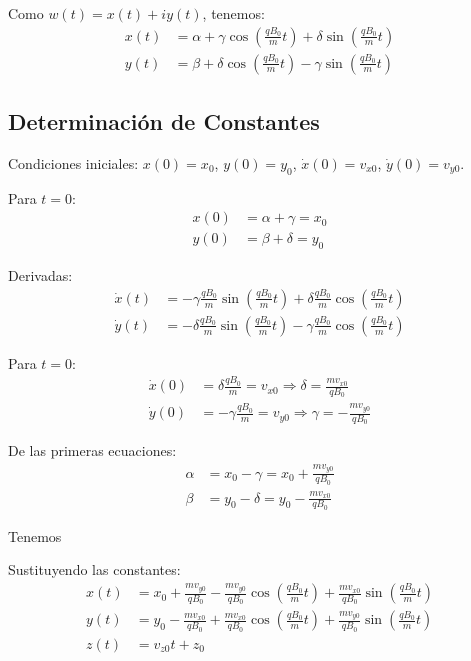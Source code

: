 \documentclass{article}
\begin{document}
Como $w(t) = x(t) + iy(t)$, tenemos:
\begin{align}
x(t) &= \alpha + \gamma\cos\left(\frac{qB_0}{m}t\right) + \delta\sin\left(\frac{qB_0}{m}t\right) \\
y(t) &= \beta + \delta\cos\left(\frac{qB_0}{m}t\right) - \gamma\sin\left(\frac{qB_0}{m}t\right)
\end{align}

\subsection*{Determinación de Constantes}

Condiciones iniciales: $x(0) = x_0$, $y(0) = y_0$, $\dot{x}(0) = v_{x0}$, $\dot{y}(0) = v_{y0}$.

Para $t = 0$:
\begin{align}
x(0) &= \alpha + \gamma = x_0 \\
y(0) &= \beta + \delta = y_0
\end{align}

Derivadas:
\begin{align}
\dot{x}(t) &= -\gamma\frac{qB_0}{m}\sin\left(\frac{qB_0}{m}t\right) + \delta\frac{qB_0}{m}\cos\left(\frac{qB_0}{m}t\right) \\
\dot{y}(t) &= -\delta\frac{qB_0}{m}\sin\left(\frac{qB_0}{m}t\right) - \gamma\frac{qB_0}{m}\cos\left(\frac{qB_0}{m}t\right)
\end{align}

Para $t = 0$:
\begin{align}
\dot{x}(0) &= \delta\frac{qB_0}{m} = v_{x0} \Rightarrow \delta = \frac{m v_{x0}}{qB_0} \\
\dot{y}(0) &= -\gamma\frac{qB_0}{m} = v_{y0} \Rightarrow \gamma = -\frac{m v_{y0}}{qB_0}
\end{align}

De las primeras ecuaciones:
\begin{align}
\alpha &= x_0 - \gamma = x_0 + \frac{m v_{y0}}{qB_0} \\
\beta &= y_0 - \delta = y_0 - \frac{m v_{x0}}{qB_0}
\end{align}

Tenemos

Sustituyendo las constantes:
\begin{align}
x(t) &= x_0 + \frac{m v_{y0}}{qB_0} - \frac{m v_{y0}}{qB_0}\cos\left(\frac{qB_0}{m}t\right) + \frac{m v_{x0}}{qB_0}\sin\left(\frac{qB_0}{m}t\right) \\
y(t) &= y_0 - \frac{m v_{x0}}{qB_0} + \frac{m v_{x0}}{qB_0}\cos\left(\frac{qB_0}{m}t\right) + \frac{m v_{y0}}{qB_0}\sin\left(\frac{qB_0}{m}t\right) \\
z(t) &= v_{z0} t + z_0
\end{align}
\end{document}
